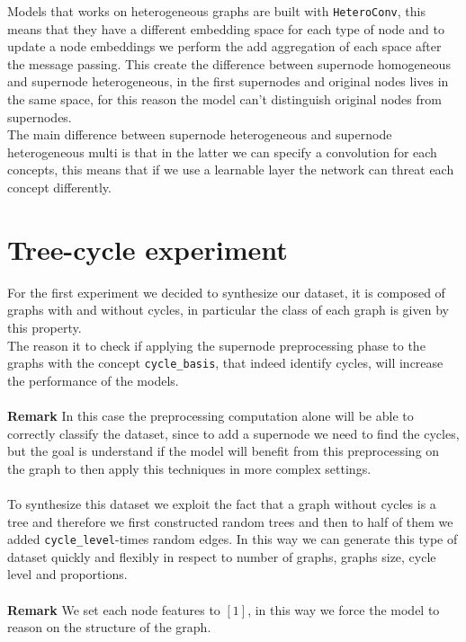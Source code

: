 \documentclass[twoside,11pt]{article}
\begin{document}
\noindent
Models that works on heterogeneous graphs are built with \texttt{HeteroConv}, this means that they have a different embedding space for each type of node and to update a node embeddings we perform the add aggregation of each space after the message passing. This create the difference between supernode homogeneous and supernode heterogeneous, in the first supernodes and original nodes lives in the same space, for this reason the model can't distinguish original nodes from supernodes.\\
The main difference between supernode heterogeneous and supernode heterogeneous multi is that in the latter we can specify a convolution for each concepts, this means that if we use a learnable layer the network can threat each concept differently.



\section{Tree-cycle experiment} %
\label{sec:tree_cycle_experiment}
For the first experiment we decided to synthesize our dataset, it is composed of graphs with and without cycles, in particular the class of each graph is given by this property. \\
The reason it to check if applying the supernode preprocessing phase to the graphs with the concept \texttt{cycle\_basis}, that indeed identify cycles,  will increase the performance of the models.\\\\
{\bf Remark}
{
        In this case the preprocessing computation alone will be able to correctly classify the dataset, since to add a supernode we need to find the cycles, but the goal is understand if the model will benefit from this preprocessing on the graph to then apply this techniques in more complex settings.
}\\\\
    \noindent
    To synthesize this dataset we exploit the fact that a graph without cycles is a tree and therefore we first constructed random trees and then to half of them we added \texttt{cycle\_level}-times random edges. In this way we can generate this type of dataset quickly and flexibly in respect to number of graphs, graphs size, cycle level and proportions.\\\\
{\bf Remark}
{
        We set each node features to \( [1] \), in this way we force the model to reason on the structure of the graph.
}
\end{document}
